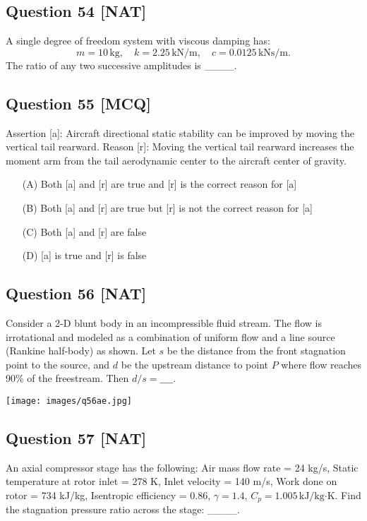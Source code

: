 \documentclass[12pt,a4paper]{article}
\begin{document}
\vspace{0.5cm}

\subsection*{Question 54 [NAT]}
A single degree of freedom system with viscous damping has:  
\[
m = 10 \, \text{kg}, \quad k = 2.25 \, \text{kN/m}, \quad c = 0.0125 \, \text{kNs/m}.
\]  
The ratio of any two successive amplitudes is \_\_\_\_.

\vspace{0.5cm}

\subsection*{Question 55 [MCQ]}
Assertion [a]: Aircraft directional static stability can be improved by moving the vertical tail rearward.  
Reason [r]: Moving the vertical tail rearward increases the moment arm from the tail aerodynamic center to the aircraft center of gravity.  
\begin{itemize}
\item[(A)] Both [a] and [r] are true and [r] is the correct reason for [a]  
\item[(B)] Both [a] and [r] are true but [r] is not the correct reason for [a]  
\item[(C)] Both [a] and [r] are false  
\item[(D)] [a] is true and [r] is false  
\end{itemize}




\subsection*{Question 56 [NAT]}
Consider a 2-D blunt body in an incompressible fluid stream. The flow is irrotational and modeled as a combination of uniform flow and a line source (Rankine half-body) as shown. Let \( s \) be the distance from the front stagnation point to the source, and \( d \) be the upstream distance to point \( P \) where flow reaches 90\% of the freestream. Then \( d/s = \_\_\_\_ \).

\texttt{[image: images/q56ae.jpg]}

\vspace{0.5cm}

\subsection*{Question 57 [NAT]}
An axial compressor stage has the following:  
Air mass flow rate = 24 kg/s, Static temperature at rotor inlet = 278 K, Inlet velocity = 140 m/s, Work done on rotor = 734 kJ/kg, Isentropic efficiency = 0.86, \( \gamma = 1.4 \), \( C_p = 1.005 \, \text{kJ/kg·K} \).  
Find the stagnation pressure ratio across the stage: \_\_\_\_.
\end{document}
